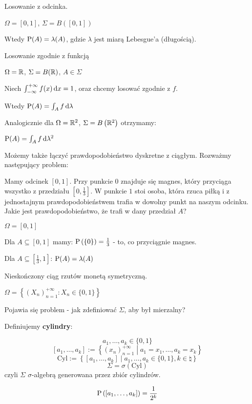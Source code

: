 \begin{example}
    Losowanie z odcinka.

    \( \Omega = [ 0, 1] \), \( \Sigma = B\left([0, 1] \right) \)

    Wtedy \( \operatorname{P}(A) = \lambda(A) \), gdzie \( \lambda \) jest miarą Lebesgue'a (długością).
    
\end{example}

\begin{example}
    Losowanie zgodnie z funkcją

    \( \Omega = \mathbb{R} \), \( \Sigma = B(\mathbb{R}) \), \( A \in \Sigma \)

    Niech \( \int_{-\infty}^{+\infty} f(x) \mathop{}\!\mathrm{d} x = 1 \), oraz chcemy losować zgodnie z \( f \).

    Wtedy \( \operatorname{P}(A) = \int_A f \mathop{}\!\mathrm{d} \lambda \) 

    Analogicznie dla \( \Omega = \mathbb{R}^2 \), \( \Sigma = B\left( \mathbb{R}^2 \right) \) otrzymamy:

    \( \operatorname{P}(A) = \int_A f \mathop{}\!\mathrm{d} \lambda^2 \)

\end{example}

\begin{example}

    Możemy także łączyć prawdopodobieństwo dyskretne z ciągłym. Rozważmy następujący problem:

    Mamy odcinek \( [0, 1] \). Przy punkcie \( 0 \) znajduje się magnes, który przyciąga wszystko z przedziału \( [0, \frac{1}{3}] \). W punkcie \( 1 \) stoi osoba, która rzuca piłką i z jednostajnym prawdopodobieństwem trafia w dowolny punkt na naszym odcinku. Jakie jest prawdopodobieństwo, że trafi w dany przedział \( A \)?

    \( \Omega = [0, 1] \)

    Dla \( A \subseteq [0, 1] \) mamy: \( \operatorname{P}\left(\{0\}\right) = \frac{1}{3} \) - to, co przyciągnie magnes.

    Dla \( A \subseteq [\frac{1}{3}, 1] \): \( \operatorname{P}(A) = \lambda(A) \)

\end{example}

\begin{example}
    Nieskończony ciąg rzutów monetą symetryczną.

    \( \Omega = \left\{ (X_n)_{n = 1}^{+\infty} : X_n \in \{0, 1\} \right\} \)

    Pojawia się problem - jak zdefiniować \( \Sigma \), aby był mierzalny?

    Definiujemy \textbf{cylindry}:

    \[ 
        a_1, \ldots, a_k \in \{0, 1\} 
    \]
    \[ 
        [a_1, \ldots, a_k] := \left\{ (x_n)_{n=1}^{+\infty} \middle| a_1 = x_1, \ldots, a_k = x_k \right\} 
    \]
    \[ 
        \text{Cyl} := \left\{ [a_1, \ldots, a_k] \middle| a_1, \ldots, a_k \in \{0, 1\}, k \in \natural \right\} 
    \]
    \[ 
        \Sigma = \sigma\left( \text{Cyl} \right) 
    \] 
    czyli \( \Sigma \) \( \sigma \)-algebrą generowana przez zbiór cylindrów.

    \[ 
        \operatorname{P}\left( [a_1, \ldots, a_k] \right) = \frac{1}{2^k} 
    \]
\end{example}
